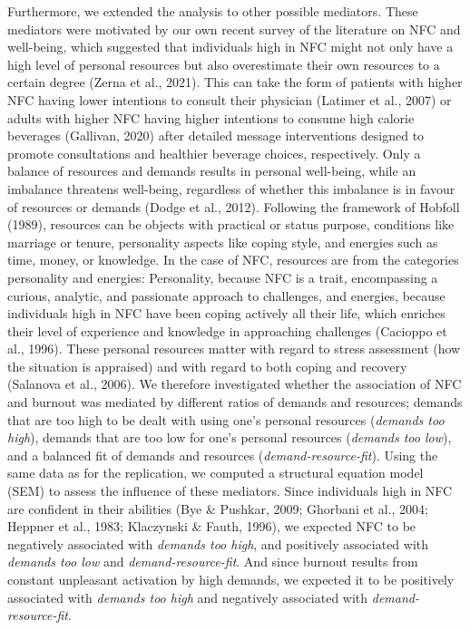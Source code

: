 \documentclass[
  english,
  man,floatsintext]{apa6}
\begin{document}
Furthermore, we extended the analysis to other possible mediators.
These mediators were motivated by our own recent survey of the literature on NFC and well-being, which suggested that individuals high in NFC might not only have a high level of personal resources but also overestimate their own resources to a certain degree (Zerna et al., 2021).
This can take the form of patients with higher NFC having lower intentions to consult their physician (Latimer et al., 2007) or adults with higher NFC having higher intentions to consume high calorie beverages (Gallivan, 2020) after detailed message interventions designed to promote consultations and healthier beverage choices, respectively.
Only a balance of resources and demands results in personal well-being, while an imbalance threatens well-being, regardless of whether this imbalance is in favour of resources or demands (Dodge et al., 2012).
Following the framework of Hobfoll (1989), resources can be objects with practical or status purpose, conditions like marriage or tenure, personality aspects like coping style, and energies such as time, money, or knowledge.
In the case of NFC, resources are from the categories personality and energies: Personality, because NFC is a trait, encompassing a curious, analytic, and passionate approach to challenges, and energies, because individuals high in NFC have been coping actively all their life, which enriches their level of experience and knowledge in approaching challenges (Cacioppo et al., 1996).
These personal resources matter with regard to stress assessment (how the situation is appraised) and with regard to both coping and recovery (Salanova et al., 2006).
We therefore investigated whether the association of NFC and burnout was mediated by different ratios of demands and resources; demands that are too high to be dealt with using one's personal resources (\emph{demands too high}), demands that are too low for one's personal resources (\emph{demands too low}), and a balanced fit of demands and resources (\emph{demand-resource-fit}).
Using the same data as for the replication, we computed a structural equation model (SEM) to assess the influence of these mediators.
Since individuals high in NFC are confident in their abilities (Bye \& Pushkar, 2009; Ghorbani et al., 2004; Heppner et al., 1983; Klaczynski \& Fauth, 1996), we expected NFC to be negatively associated with \emph{demands too high}, and positively associated with \emph{demands too low} and \emph{demand-resource-fit}.
And since burnout results from constant unpleasant activation by high demands, we expected it to be positively associated with \emph{demands too high} and negatively associated with \emph{demand-resource-fit}.
\end{document}
